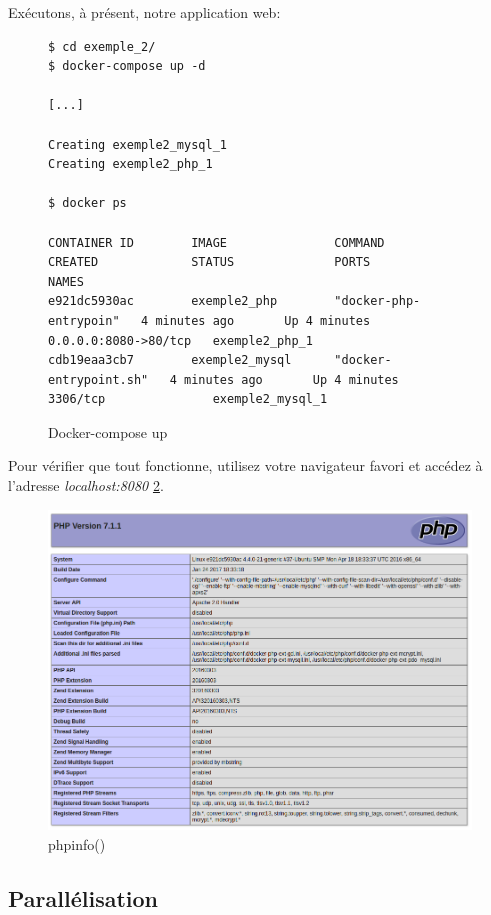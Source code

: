 \newpage
Exécutons, à présent, notre application web:

\begin{figure}[H] 
\centering 
\begin{lstlisting}[frame=single]
$ cd exemple_2/
$ docker-compose up -d

[...]

Creating exemple2_mysql_1
Creating exemple2_php_1

$ docker ps

CONTAINER ID        IMAGE               COMMAND                  CREATED             STATUS              PORTS                  NAMES
e921dc5930ac        exemple2_php        "docker-php-entrypoin"   4 minutes ago       Up 4 minutes        0.0.0.0:8080->80/tcp   exemple2_php_1
cdb19eaa3cb7        exemple2_mysql      "docker-entrypoint.sh"   4 minutes ago       Up 4 minutes        3306/tcp               exemple2_mysql_1

\end{lstlisting}
\caption[Docker-compose up]{Docker-compose up}
\label{fig:composeUp} 
\end{figure}

Pour vérifier que tout fonctionne, utilisez votre navigateur favori et accédez à l'adresse \emph{localhost:8080} \ref{fig:phpinfo}.

\begin{figure}[H] 
\centering 
\includegraphics[width=0.8\columnwidth]{img/phpinfo} 
\caption[phpinfo]{phpinfo()}
\label{fig:phpinfo} 
\end{figure}

\subsection{Parallélisation}

